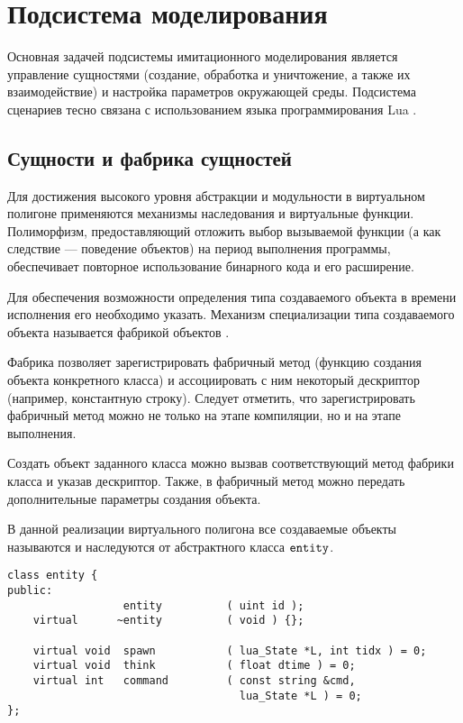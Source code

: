 \section{Подсистема моделирования}

Основная задачей подсистемы имитационного моделирования является управление сущностями (создание, обработка и уничтожение, а также их взаимодействие) и настройка параметров окружающей среды. Подсистема сценариев тесно связана с использованием языка программирования Lua \citep{lua}.

%

\subsection{Сущности и фабрика сущностей}

Для достижения высокого уровня абстракции и модульности в виртуальном полигоне применяются механизмы наследования и виртуальные функции. Полиморфизм, предоставляющий отложить выбор вызываемой функции (а как следствие --- поведение объектов) на период выполнения программы, обеспечивает повторное использование бинарного кода и его расширение.

Для обеспечения возможности определения типа создаваемого объекта в времени исполнения его необходимо указать. Механизм специализации типа создаваемого объекта называется фабрикой объектов \citep{alexandresku}.

Фабрика позволяет зарегистрировать фабричный метод (функцию создания объекта конкретного класса) и ассоциировать с ним некоторый дескриптор (например, константную строку). Следует отметить, что зарегистрировать фабричный метод можно не только на этапе компиляции, но и на этапе выполнения.

Создать объект заданного класса можно вызвав соответствующий метод фабрики класса и указав дескриптор.
Также, в фабричный метод можно передать дополнительные параметры создания объекта.

В данной реализации виртуального полигона все создаваемые объекты называются  и наследуются от абстрактного класса $\tt entity$.

\begin{lstlisting}[caption={Декларация класса $\tt entity$}]
class entity {
public:
                  entity          ( uint id );
    virtual      ~entity          ( void ) {};
							
    virtual void  spawn           ( lua_State *L, int tidx ) = 0;
    virtual void  think           ( float dtime ) = 0;
    virtual int   command         ( const string &cmd, 
                                    lua_State *L ) = 0;
};
\end{lstlisting}

